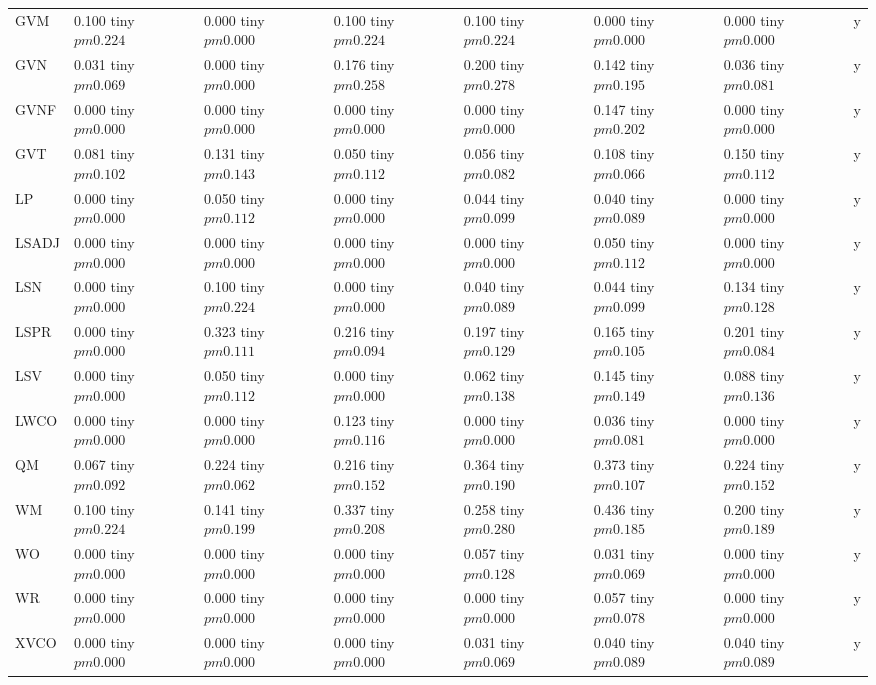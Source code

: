 \begin{table}
\begin{tabular}{llllllll}
GVM & 0.100 tiny $ pm 0.224$ & 0.000 tiny $ pm 0.000$ & 0.100 tiny $ pm 0.224$ & 0.100 tiny $ pm 0.224$ & 0.000 tiny $ pm 0.000$ & 0.000 tiny $ pm 0.000$ & y \\
GVN & 0.031 tiny $ pm 0.069$ & 0.000 tiny $ pm 0.000$ & 0.176 tiny $ pm 0.258$ & 0.200 tiny $ pm 0.278$ & 0.142 tiny $ pm 0.195$ & 0.036 tiny $ pm 0.081$ & y \\
GVNF & 0.000 tiny $ pm 0.000$ & 0.000 tiny $ pm 0.000$ & 0.000 tiny $ pm 0.000$ & 0.000 tiny $ pm 0.000$ & 0.147 tiny $ pm 0.202$ & 0.000 tiny $ pm 0.000$ & y \\
GVT & 0.081 tiny $ pm 0.102$ & 0.131 tiny $ pm 0.143$ & 0.050 tiny $ pm 0.112$ & 0.056 tiny $ pm 0.082$ & 0.108 tiny $ pm 0.066$ & 0.150 tiny $ pm 0.112$ & y \\
LP & 0.000 tiny $ pm 0.000$ & 0.050 tiny $ pm 0.112$ & 0.000 tiny $ pm 0.000$ & 0.044 tiny $ pm 0.099$ & 0.040 tiny $ pm 0.089$ & 0.000 tiny $ pm 0.000$ & y \\
LSADJ & 0.000 tiny $ pm 0.000$ & 0.000 tiny $ pm 0.000$ & 0.000 tiny $ pm 0.000$ & 0.000 tiny $ pm 0.000$ & 0.050 tiny $ pm 0.112$ & 0.000 tiny $ pm 0.000$ & y \\
LSN & 0.000 tiny $ pm 0.000$ & 0.100 tiny $ pm 0.224$ & 0.000 tiny $ pm 0.000$ & 0.040 tiny $ pm 0.089$ & 0.044 tiny $ pm 0.099$ & 0.134 tiny $ pm 0.128$ & y \\
LSPR & 0.000 tiny $ pm 0.000$ & 0.323 tiny $ pm 0.111$ & 0.216 tiny $ pm 0.094$ & 0.197 tiny $ pm 0.129$ & 0.165 tiny $ pm 0.105$ & 0.201 tiny $ pm 0.084$ & y \\
LSV & 0.000 tiny $ pm 0.000$ & 0.050 tiny $ pm 0.112$ & 0.000 tiny $ pm 0.000$ & 0.062 tiny $ pm 0.138$ & 0.145 tiny $ pm 0.149$ & 0.088 tiny $ pm 0.136$ & y \\
LWCO & 0.000 tiny $ pm 0.000$ & 0.000 tiny $ pm 0.000$ & 0.123 tiny $ pm 0.116$ & 0.000 tiny $ pm 0.000$ & 0.036 tiny $ pm 0.081$ & 0.000 tiny $ pm 0.000$ & y \\
QM & 0.067 tiny $ pm 0.092$ & 0.224 tiny $ pm 0.062$ & 0.216 tiny $ pm 0.152$ & 0.364 tiny $ pm 0.190$ & 0.373 tiny $ pm 0.107$ & 0.224 tiny $ pm 0.152$ & y \\
WM & 0.100 tiny $ pm 0.224$ & 0.141 tiny $ pm 0.199$ & 0.337 tiny $ pm 0.208$ & 0.258 tiny $ pm 0.280$ & 0.436 tiny $ pm 0.185$ & 0.200 tiny $ pm 0.189$ & y \\
WO & 0.000 tiny $ pm 0.000$ & 0.000 tiny $ pm 0.000$ & 0.000 tiny $ pm 0.000$ & 0.057 tiny $ pm 0.128$ & 0.031 tiny $ pm 0.069$ & 0.000 tiny $ pm 0.000$ & y \\
WR & 0.000 tiny $ pm 0.000$ & 0.000 tiny $ pm 0.000$ & 0.000 tiny $ pm 0.000$ & 0.000 tiny $ pm 0.000$ & 0.057 tiny $ pm 0.078$ & 0.000 tiny $ pm 0.000$ & y \\
XVCO & 0.000 tiny $ pm 0.000$ & 0.000 tiny $ pm 0.000$ & 0.000 tiny $ pm 0.000$ & 0.031 tiny $ pm 0.069$ & 0.040 tiny $ pm 0.089$ & 0.040 tiny $ pm 0.089$ & y \\
\bottomrule
\end{tabular}
\end{table}
